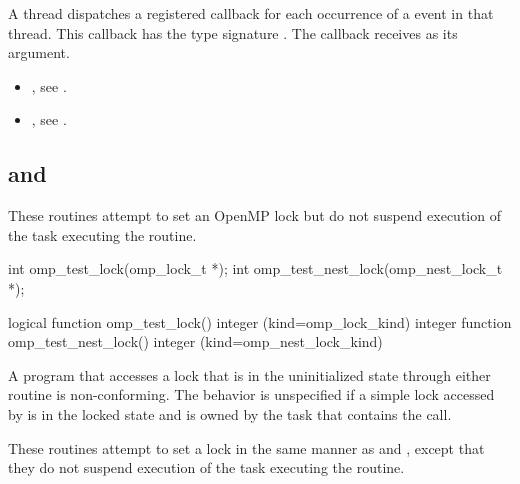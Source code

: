 A thread dispatches a registered 
callback for each occurrence of a  event
in that thread. This callback has the type signature .
The callback receives  as its  argument.

\crossreferences
\begin{itemize}
\item {}, see
.
\item {}, see
.
\end{itemize}








\subsection{ and }
\label{subsec:omp_test_lock and omp_test_nest_lock}
\summary
These routines attempt to set an OpenMP lock but do not suspend execution of the task
executing the routine.

\format
\begin{ccppspecific}
\begin{ompcFunction}
int omp_test_lock(omp_lock_t *);
int omp_test_nest_lock(omp_nest_lock_t *);
\end{ompcFunction}
\end{ccppspecific}

\begin{fortranspecific}
\begin{ompfFunction}
logical function omp_test_lock()
integer (kind=omp_lock_kind) 
integer function omp_test_nest_lock()
integer (kind=omp_nest_lock_kind) 
\end{ompfFunction}
\end{fortranspecific}

\constraints
A program that accesses a lock that is in the uninitialized state through either routine is
non-conforming. The behavior is unspecified if a simple lock accessed by
 is in the locked state and is owned by the task that contains the call.

\effect
These routines attempt to set a lock in the same manner as  and
, except that they do not suspend execution of the task
executing the routine.

